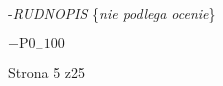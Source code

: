 \documentclass[a4paper,12pt]{article}
\begin{document}
-{\it RUDNOPIS} \{{\it nie podlega ocenie}\}

$-\mathrm{P}0_{-}100$

Strona 5 z25
\end{document}
